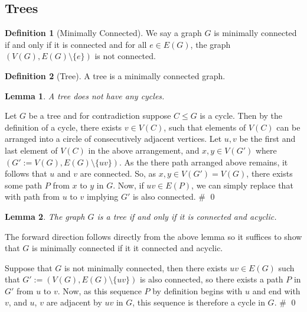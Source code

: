 \documentclass[
]{article}
\newtheorem{lemma}{Lemma}
\theoremstyle{definition}
\newtheorem{definition}{Definition}[section]
\begin{document}
\hypertarget{trees}{%
\subsection{Trees}\label{trees}}

\begin{definition}[Minimally Connected]
  We say a graph \(G\) is minimally connected if and only if it is connected 
  and for all \(e \in E(G)\), the graph \((V(G), E(G) \setminus \{e\})\) is not 
  connected.
\end{definition}

\begin{definition}[Tree]
  A tree is a minimally connected graph.
\end{definition}

\begin{lemma}
  A tree does not have any cycles.
\end{lemma}
\proof

Let \(G\) be a tree and for contradiction suppose \(C \le G\) is a
cycle. Then by the definition of a cycle, there exists \(v \in V(C)\),
such that elements of \(V(C)\) can be arranged into a circle of
consecutively adjacent vertices. Let \(u, v\) be the first and last
element of \(V(C)\) in the above arrangement, and \(x, y \in V(G')\)
where \((G' := V(G), E(G) \setminus \{uv\})\). As the there path
arranged above remains, it follows that \(u\) and \(v\) are connected.
So, as \(x, y \in V(G') = V(G)\), there exists some path \(P\) from
\(x\) to \(y\) in \(G\). Now, if \(uv \in E(P)\), we can simply replace
that with path from \(u\) to \(v\) implying \(G'\) is also connected. \#
\qed

\begin{lemma}\label{tree_acyclic}
  The graph \(G\) is a tree if and only if it is connected and acyclic.
\end{lemma}
\proof

The forward direction follows directly from the above lemma so it
suffices to show that \(G\) is minimally connected if it it connected
and acyclic.

Suppose that \(G\) is not minimally connected, then there exists
\(uv \in E(G)\) such that \(G' := (V(G), E(G) \setminus \{uv\})\) is
also connected, so there exists a path \(P\) in \(G'\) from \(u\) to
\(v\). Now, as this sequence \(P\) by definition begins with \(u\) and
end with \(v\), and \(u\), \(v\) are adjacent by \(uv\) in \(G\), this
sequence is therefore a cycle in \(G\). \# \qed
\end{document}

